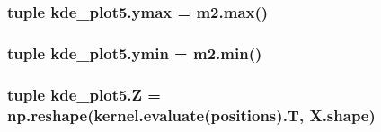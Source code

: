 \subsubsection[{ymax}]{\setlength{\rightskip}{0pt plus 5cm}tuple kde\+\_\+plot5.\+ymax = {\bf m2.\+max}()}\label{namespacekde__plot5_a24bb72e67b6c830730f5ea7b1ef86504}
\hypertarget{namespacekde__plot5_a7f07b544e2e02e62d83e39a988650d16}{}
\subsubsection[{ymin}]{\setlength{\rightskip}{0pt plus 5cm}tuple kde\+\_\+plot5.\+ymin = {\bf m2.\+min}()}\label{namespacekde__plot5_a7f07b544e2e02e62d83e39a988650d16}
\hypertarget{namespacekde__plot5_ac3ef56788a3a50a5ab137ed33dd008af}{}
\subsubsection[{Z}]{\setlength{\rightskip}{0pt plus 5cm}tuple kde\+\_\+plot5.\+Z = np.\+reshape(kernel.\+evaluate({\bf positions}).T, {\bf X.\+shape})}\label{namespacekde__plot5_ac3ef56788a3a50a5ab137ed33dd008af}
